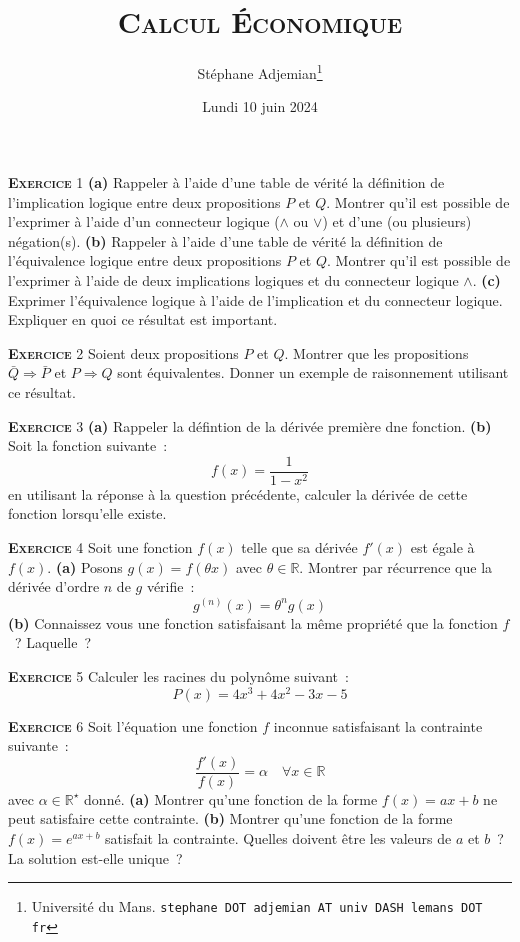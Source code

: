 \documentclass[10pt,a4paper,notitlepage,twocolumn]{article}
\newcommand{\exercise}[1]{\textsc{\textbf{Exercice}} #1}
\newcommand{\question}[1]{\textbf{(#1)}}
\begin{document}
\title{\textsc{Calcul Économique}}
\author{Stéphane Adjemian\thanks{Université du Mans. \texttt{stephane DOT adjemian AT univ DASH lemans DOT fr}}}
\date{Lundi 10 juin 2024}

\maketitle
\thispagestyle{empty}

\exercise{1} \question{a} Rappeler à l'aide d'une table de vérité la
définition de l'implication logique entre deux propositions $P$ et
$Q$. Montrer qu'il est possible de l'exprimer à l'aide d'un connecteur
logique ($\land$ ou $\lor$) et d'une (ou plusieurs)
négation(s). \question{b} Rappeler à l'aide d'une table de vérité la
définition de l'équivalence logique entre deux propositions $P$ et
$Q$. Montrer qu'il est possible de l'exprimer à l'aide de deux
implications logiques et du connecteur logique $\land$. \question{c}
Exprimer l'équivalence logique à l'aide de l'implication et du
connecteur logique. Expliquer en quoi ce résultat est important.

\bigskip
  
\exercise{2} Soient deux propositions $P$ et $Q$. Montrer que les
propositions $\bar Q \Rightarrow \bar P$ et $P \Rightarrow Q$ sont
équivalentes. Donner un exemple de raisonnement utilisant ce résultat.

\bigskip

\exercise{3} \question{a} Rappeler la défintion de la dérivée première
dne fonction. \question{b} Soit la fonction suivante :
\[
f(x) = \frac{1}{1-x^2}
\]
en utilisant la réponse à la question précédente, calculer la dérivée
de cette fonction lorsqu'elle existe.

\bigskip

\exercise{4} Soit une fonction $f(x)$ telle que sa dérivée $f'(x)$ est
égale à $f(x)$. \question{a} Posons $g(x) = f(\theta x)$ avec
$\theta\in\mathbb R$. Montrer par récurrence que la dérivée d'ordre
$n$ de $g$ vérifie :
\[
g^{(n)}(x) = \theta^{n}g(x)
\]
\question{b} Connaissez vous une fonction satisfaisant la même
propriété que la fonction $f$ ? Laquelle ?

\bigskip

\exercise{5} Calculer les racines du polynôme suivant : 
\[
P(x) = 4x^3+4x^2-3x-5
\]

\bigskip

\exercise{6} Soit l'équation une fonction $f$ inconnue satisfaisant la contrainte suivante :
\[
\frac{f'(x)}{f(x)} = \alpha\quad \forall x\in \mathbb R
\]
avec $\alpha\in\mathbb R^{\star}$ donné. \question{a} Montrer qu'une
fonction de la forme $f(x) = ax+b$ ne peut satisfaire cette
contrainte. \question{b} Montrer qu'une fonction de la forme
$f(x)=e^{ax+b}$ satisfait la contrainte. Quelles doivent être les valeurs de
$a$ et $b$ ? La solution est-elle unique ?
\end{document}
